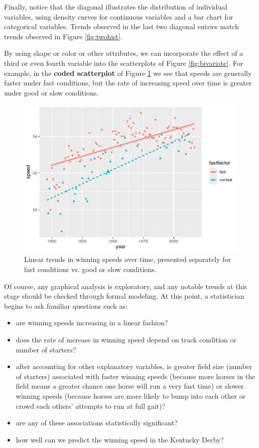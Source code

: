 \documentclass[
]{krantz}
\providecommand{\tightlist}{%
  \setlength{\itemsep}{0pt}\setlength{\parskip}{0pt}}
\begin{document}
Finally, notice that the diagonal illustrates the distribution of individual variables, using density curves for continuous variables and a bar chart for categorical variables. Trends observed in the last two diagonal entries match trends observed in Figure \ref{fig:twohist}.

By using shape or color or other attributes, we can incorporate the effect of a third or even fourth variable into the scatterplots of Figure \ref{fig:bivariate}. For example, in the \textbf{coded scatterplot}  of Figure \ref{fig:codeds} we see that speeds are generally faster under fast conditions, but the rate of increasing speed over time is greater under good or slow conditions.

\begin{figure}

{\centering \includegraphics[width=0.9\linewidth]{bookdown-BeyondMLR_files/figure-latex/codeds-1} 

}

\caption{Linear trends in winning speeds over time, presented separately for fast conditions vs. good or slow conditions.}\label{fig:codeds}
\end{figure}

Of course, any graphical analysis is exploratory, and any notable trends at this stage should be checked through formal modeling. At this point, a statistician begins to ask familiar questions such as:

\begin{itemize}
\tightlist
\item
  are winning speeds increasing in a linear fashion?
\item
  does the rate of increase in winning speed depend on track condition or number of starters?
\item
  after accounting for other explanatory variables, is greater field size (number of starters) associated with faster winning speeds (because more horses in the field means a greater chance one horse will run a very fast time) or slower winning speeds (because horses are more likely to bump into each other or crowd each others' attempts to run at full gait)?
\item
  are any of these associations statistically significant?
\item
  how well can we predict the winning speed in the Kentucky Derby?
\end{itemize}
\end{document}
